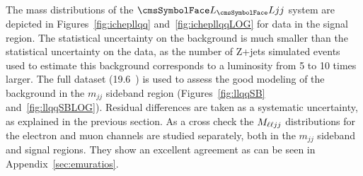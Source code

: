 The mass distributions of the $\LL jj$ system are depicted in Figures~\ref{fig:ichepllqq} and~\ref{fig:ichepllqqLOG} for data in the signal region. The statistical uncertainty on the background is much smaller than the statistical uncertainty on the data, as the number of Z+jets simulated events used to estimate this background corresponds to a luminosity from 5 to 10 times larger. The full dataset (19.6~\fbinv{}) is used to assess the good modeling of the background in the $m_{jj}$ sideband region (Figures~\ref{fig:llqqSB} and~\ref{fig:llqqSBLOG}). Residual differences are taken as a systematic uncertainty, as explained in the previous section. As a cross check the $M_{\ell\ell jj}$ distributions for the electron and muon channels are studied separately, both in the $m_{jj}$ sideband and signal regions.  They show an excellent agreement as can be seen in Appendix~\ref{sec:emuratios}.

